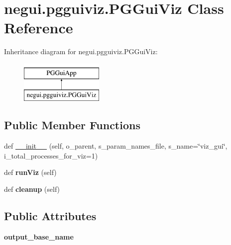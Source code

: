 \hypertarget{classnegui_1_1pgguiviz_1_1PGGuiViz}{}\section{negui.\+pgguiviz.\+P\+G\+Gui\+Viz Class Reference}
\label{classnegui_1_1pgguiviz_1_1PGGuiViz}
Inheritance diagram for negui.\+pgguiviz.\+P\+G\+Gui\+Viz\+:\begin{figure}[H]
\begin{center}
\leavevmode
\includegraphics[height=2.000000cm]{classnegui_1_1pgguiviz_1_1PGGuiViz}
\end{center}
\end{figure}
\subsection*{Public Member Functions}
\begin{DoxyCompactItemize}
\item 
def \hyperlink{classnegui_1_1pgguiviz_1_1PGGuiViz_ace2dbe2e34a22ee3f571bd51d5ebd1bb}{\+\_\+\+\_\+init\+\_\+\+\_\+} (self, o\+\_\+parent, s\+\_\+param\+\_\+names\+\_\+file, s\+\_\+name=\char`\"{}viz\+\_\+gui\char`\"{}, i\+\_\+total\+\_\+processes\+\_\+for\+\_\+viz=1)
\item 
def {\bfseries run\+Viz} (self)\hypertarget{classnegui_1_1pgguiviz_1_1PGGuiViz_a1cda2dd92cf73236d516c84121fc35f4}{}\label{classnegui_1_1pgguiviz_1_1PGGuiViz_a1cda2dd92cf73236d516c84121fc35f4}

\item 
def {\bfseries cleanup} (self)\hypertarget{classnegui_1_1pgguiviz_1_1PGGuiViz_aaea72bbc4e508528a954e739a2829213}{}\label{classnegui_1_1pgguiviz_1_1PGGuiViz_aaea72bbc4e508528a954e739a2829213}

\end{DoxyCompactItemize}
\subsection*{Public Attributes}
\begin{DoxyCompactItemize}
\item 
{\bfseries output\+\_\+base\+\_\+name}\hypertarget{classnegui_1_1pgguiviz_1_1PGGuiViz_a38bbcd1793a59cee540c1168db30bc6b}{}\label{classnegui_1_1pgguiviz_1_1PGGuiViz_a38bbcd1793a59cee540c1168db30bc6b}

\end{DoxyCompactItemize}

